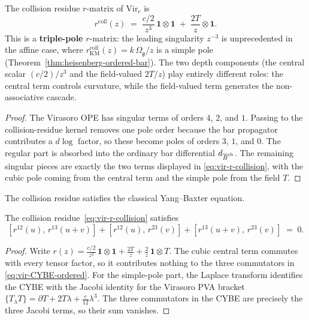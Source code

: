 \begin{proposition}
\label{prop:vir-collision-residue}
The collision residue $r$-matrix of\/ $\mathrm{Vir}_c$ is
\begin{equation}\label{eq:vir-r-collision}
r^{\mathrm{coll}}(z)
\;=\;
\frac{c/2}{z^3}\,\mathbf{1}\otimes\mathbf{1}
\;+\;
\frac{2T}{z}\otimes\mathbf{1}.
\end{equation}
This is a \textbf{triple-pole} $r$-matrix: the leading singularity
$z^{-3}$ is unprecedented in the affine case, where
$r^{\mathrm{coll}}_{\mathrm{KM}}(z) = k\,\Omega_{\mathfrak{g}}/z$ is a
simple pole
\textup{(}Theorem~\textup{\ref{thm:heisenberg-ordered-bar})}.
The two depth components (the central scalar
$(c/2)/z^3$ and the field-valued $2T/z$) play entirely different
roles: the central term controls curvature, while the field-valued
term generates the non-associative cascade.
\end{proposition}

\begin{proof}
The Virasoro OPE has singular terms of orders $4$, $2$, and $1$.
Passing to the collision-residue kernel removes one pole order because
the bar propagator contributes a $d\log$ factor, so these become poles
of orders $3$, $1$, and $0$.
The regular part is absorbed into the ordinary bar differential
$d_{\overline{B}^{\mathrm{ch}}}$.
The remaining singular pieces are exactly the two terms displayed in
\eqref{eq:vir-r-collision}, with the cubic pole coming from the
central term and the simple pole from the field $T$.
\end{proof}

The collision residue satisfies the classical Yang--Baxter equation.

\begin{proposition}
\label{prop:vir-CYBE-ordered}
The collision residue~\eqref{eq:vir-r-collision} satisfies
\begin{equation}\label{eq:vir-CYBE-ordered}
[r^{12}(u),\, r^{13}(u+v)]
+ [r^{12}(u),\, r^{23}(v)]
+ [r^{13}(u+v),\, r^{23}(v)]
\;=\; 0.
\end{equation}
\end{proposition}

\begin{proof}
Write
$r(z)=\frac{c/2}{z^3}\,\mathbf 1\otimes\mathbf 1+\frac{2T}{z}
+\frac{2}{z}\,\mathbf 1\otimes T$.
The cubic central term commutes with every tensor factor, so it
contributes nothing to the three commutators in
\eqref{eq:vir-CYBE-ordered}.
For the simple-pole part, the Laplace transform identifies the CYBE
with the Jacobi identity for the Virasoro PVA bracket
$\{T{}_\lambda T\}=\partial T+2T\lambda+\frac{c}{12}\lambda^3$.
The three commutators in the CYBE are precisely the three Jacobi terms,
so their sum vanishes.
\end{proof}

